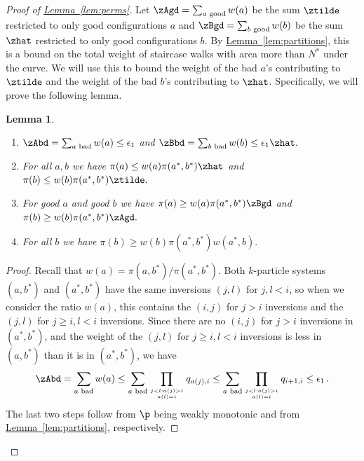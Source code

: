 \documentclass[11pt]{article}
\newtheorem{lemma}[theorem]{Lemma}
\providecommand{\expref}[2]{\texorpdfstring{\hyperref[#2]{#1~\ref{#2}}}{#1~\ref{#2}}}
\begin{document}
\begin{proof}[Proof of \expref{Lemma}{lem:perms}]
Let $\zAgd = \sum_{a \text{ good}} w(a)$ be the sum $\ztilde$ restricted 
to only good configurations $a$ and $\zBgd = \sum_{b \text{ good}} w(b)$ 
be the sum $\zhat$ restricted to only good configurations $b$. 
By \expref{Lemma}{lem:partitions}, this is a bound on the total weight of 
staircase walks with area more than $N^*$ under the curve.  We will use 
this to bound the weight of the bad $a$'s contributing to $\ztilde$ and 
the weight of the bad $b$'s contributing to $\zhat$.  Specifically, we 
will prove the following lemma.

\begin{lemma}\label{lem:zBound}\ \  
  \begin{enumerate}
  \item $\zAbd =  \sum_{a \text{ bad}} w(a) \leq \epsilon_1$ and $\zBbd =  \sum_{b \text{ bad}} w(b) \leq \epsilon_1\zhat.$
 \item For all $a,b$ we have $\pi(a)\leq w(a)\pi(a^*,b^*)\zhat$ and $\pi(b)\leq w(b)\pi(a^*,b^*)\ztilde.$
 \item For \emph{good} $a$ and \emph{good} $b$ we have $\pi(a) \geq w(a) \pi(a^*,b^*)\zBgd$ and $\pi(b) \geq w(b) \pi(a^*,b^*)\zAgd.$
 \item For all $b$ we have $\pi(b) \geq w(b)\pi(a^*,b^*)w(a^*,b).$
    \end{enumerate}
    \end{lemma}
\begin{proof}
 Recall that $w(a) = \pi(a,b^*)/\pi(a^*,b^*).$  Both $k$-particle 
systems $(a,b^*)$ and $(a^*,b^*)$ have the same inversions $(j,l)$ for 
$j,l < i$, so when we consider the ratio $w(a)$, this contains the 
$(i,j)$ for $j > i$ inversions and the $(j,l)$ for $j \geq i, l < i$ 
inversions. Since there are no $(i,j)$ for $j > i$ inversions in 
$(a^*,b^*)$, and the weight of the $(j,l)$ for $j \geq i, l < i$ 
inversions is less in $(a,b^*)$ than it is in $(a^*,b^*)$, we have 
$$\zAbd =  \sum_{a \text{ bad}} w(a) \leq \sum_{a \text{ 
bad}}\prod_{j<l: a(j) > i \atop a(l) = i}q_{a(j), i} \leq \sum_{a 
\text{ bad}}\prod_{j<l: a(j) > i \atop a(l) = i}q_{i+1, i} \leq 
\epsilon_1\,.$$ The last two steps follow from $\p$ being weakly 
monotonic and
from  %
\expref{Lemma}{lem:partitions}, respectively.   


\end{proof}
\end{proof}
\end{document}
